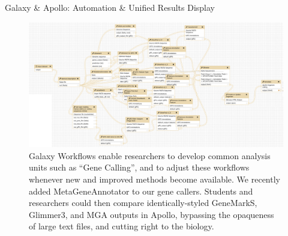 \documentclass[final,t,20pt]{beamer}
\begin{document}
\begin{frame}[fragile]
\begin{columns}[t]
\begin{column}{.60\linewidth}
\begin{block}{Galaxy \& Apollo: Automation \& Unified Results Display }
                \begin{figure}
                    \includegraphics[width=\textwidth]{./media/workflow.png}
                    \caption{Galaxy Workflows enable researchers to develop
                    common analysis units such as ``Gene Calling'', and to
                    adjust these workflows whenever new and improved methods
                    become available. We recently added MetaGeneAnnotator to our
                    gene callers. Students and researchers could then
                    compare identically-styled GeneMarkS, Glimmer3, and MGA
                    outputs in Apollo, bypassing the opaqueness of large text
                    files, and cutting right to the biology.}
                \end{figure}
            \end{block}
        \end{column}
  \end{columns}
\end{frame}
\end{document}
